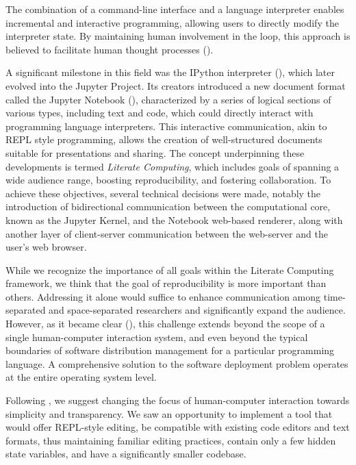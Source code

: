 \documentclass[letterpaper,12pt,twocolumn]{article}
\begin{document}
The combination of a command-line interface and a language interpreter enables
incremental and interactive programming, allowing users to directly modify the
interpreter state. By maintaining human involvement in the loop, this approach
is believed to facilitate human thought processes (\textcite{Granger2021litcomp}).

A significant milestone in this field was the IPython interpreter
(\textcite{Perez2007IPython}), which later evolved into the Jupyter Project. Its
creators introduced a new document format called the Jupyter Notebook
(\textcite{Kluyver2016jupnb}), characterized by a series of logical sections of
various types, including text and code, which could directly interact with
programming language interpreters. This interactive communication, akin to REPL
style programming, allows the creation of well-structured documents suitable for
presentations and sharing. The concept underpinning these developments is termed
\textit{Literate Computing}\cite{Perez2015blog}, which includes goals of
spanning a wide audience range, boosting reproducibility, and fostering
collaboration. To achieve these objectives, several technical decisions were
made, notably the introduction of bidirectional communication between the
computational core, known as the Jupyter Kernel, and the Notebook web-based
renderer, along with another layer of client-server communication between the
web-server and the user’s web browser.

While we recognize the importance of all goals within the Literate Computing
framework, we think that the goal of reproducibility is more important than
others. Addressing it alone would suffice to enhance communication among
time-separated and space-separated researchers and significantly expand the
audience. However, as it became clear (\textcite{Dolstra2010}), this challenge
extends beyond the scope of a single human-computer interaction system, and even
beyond the typical boundaries of software distribution management for a
particular programming language. A comprehensive solution to the software
deployment problem operates at the entire operating system level.

Following \textcite{Vallet2022}, we suggest changing the focus of human-computer
interaction towards simplicity and transparency. We saw an opportunity to
implement a tool that would offer REPL-style editing, be compatible with
existing code editors and text formats, thus maintaining familiar editing
practices, contain only a few hidden state variables, and have a significantly
smaller codebase.
\end{document}
